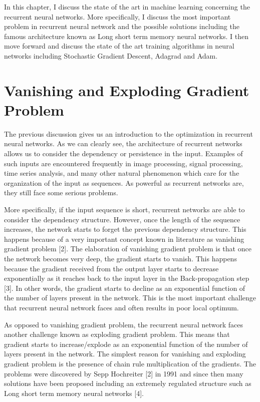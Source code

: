 In this chapter, I discuss the state of the art in machine learning concerning the recurrent neural networks. More specifically, I discuss the most important problem in recurrent neural network and the possible solutions including the famous architecture known as Long short term memory neural networks. I then move forward and discuss the state of the art training algorithms in neural networks including Stochastic Gradient Descent, Adagrad and Adam. 

\section {Vanishing and Exploding Gradient Problem}

The previous discussion gives us an introduction to the optimization in recurrent neural networks. As we can clearly see, the architecture of recurrent networks allows us to consider the dependency or persistence in the input. Examples of such inputs are encountered frequently in image processing, signal processing, time series analysis, and many other natural phenomenon which care for the organization of the input as sequences. As powerful as recurrent networks are, they still face some serious problems. 

More specifically, if the input sequence is short, recurrent networks are able to consider the dependency structure. However, once the length of the sequence increases, the network starts to forget the previous dependency structure. This happens because of a very important concept known in literature as vanishing gradient problem [2]. The elaboration of vanishing gradient problem is that once the network becomes very deep, the gradient starts to vanish. This happens because the gradient received from the output layer starts to decrease exponentially as it reaches back to the input layer in the Back-propagation step [3]. In other words, the gradient starts to decline as an exponential function of the number of layers present in the network. This is the most important challenge that recurrent neural network faces and often results in poor local optimum.

As opposed to vanishing gradient problem, the recurrent neural network faces another challenge known as exploding gradient problem. This means that gradient starts to increase/explode as an exponential function  of the number of layers present in the network. The simplest reason for vanishing and exploding gradient problem is the presence of chain rule multiplication of the gradients. The problems were discovered by Sepp Hochreiter [2] in 1991 and since then many solutions have been proposed including an extremely regulated structure such as Long short term memory neural networks [4]. 

